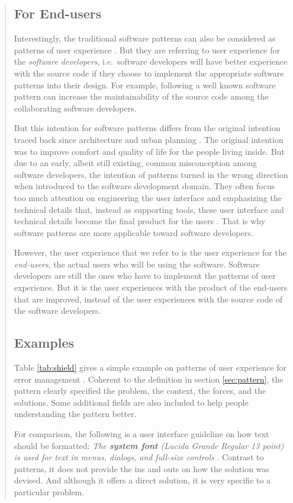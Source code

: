 \documentclass[a4paper,titlepage]{article}
\begin{document}
\begin{quote}
\subsection{For End-users}
Interestingly, the traditional software patterns can also be
considered as patterns of user experience \citep{pux:blackwell}. But
they are referring to user experience for the \textit{software
  developers}, i.e.\ software developers will have better experience
with the source code if they choose to implement the appropriate
software patterns into their design. For example, following a well
known software pattern can increase the maintainability of the source
code among the collaborating software developers.

But this intention for software patterns differs from the original
intention traced back since architecture and urban planning
\citep{timeless:alexander}. The original intention was to improve
comfort and quality of life for the people living inside. But due to
an early, albeit still existing, common misconception among software
developers, the intention of patterns turned in the wrong direction
when introduced to the software development domain. They often focus
too much attention on engineering the user interface and emphasizing
the technical details that, instead as supporting tools, these user
interface and technical details become the final product for the users
\citep{pux:blackwell}. That is why software patterns are more
applicable toward software developers.

However, the user experience that we refer to is the user experience
for the \textit{end-users}, the actual users who will be using the
software. Software developers are still the ones who have to implement
the patterns of user experience. But it is the user experiences with
the product of the end-users that are improved, instead of the user
experiences with the source code of the software developers.

\subsection{Examples}
Table \ref{tab:shield} gives a simple example on patterns of user
experience for error management \citep{patterns:welie}. Coherent to
the definition in section \ref{sec:pattern}, the pattern clearly
specified the problem, the context, the forces, and the
solutions. Some additional fields are also included to help people
understanding the pattern better.

For comparison, the following is a user interface guideline on how
text should be formatted: \textit{The \textbf{system font} (Lucida
  Grande Regular 13 point) is used for text in menus, dialogs, and
  full-size controls} \citep{hig:apple}. Contrast to patterns, it does
not provide the ins and outs on how the solution was devised. And
although it offers a direct solution, it is very specific to a
particular problem.


\end{quote}
\end{document}
